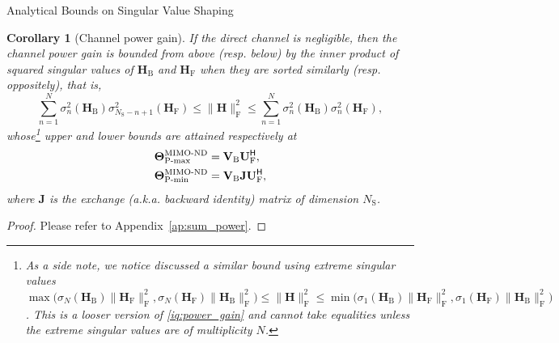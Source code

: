 \documentclass[journal]{IEEEtran}
\newtheorem{corollary}{Corollary}[proposition]
\begin{document}
\begin{section}{Analytical Bounds on Singular Value Shaping}
		\begin{corollary}[Channel power gain\label{co:sum_power}]
			If the direct channel is negligible, then the channel power gain is bounded from above (resp. below) by the inner product of squared singular values of $\mathbf{H}_\mathrm{B}$ and $\mathbf{H}_\mathrm{F}$ when they are sorted similarly (resp. oppositely), that is,
			\begin{equation}
				\sum_{n=1}^N \sigma_n^2(\mathbf{H}_\mathrm{B}) \sigma_{N_\mathrm{S}-n+1}^2(\mathbf{H}_\mathrm{F}) \le \lVert \mathbf{H} \rVert _\mathrm{F}^2 \le \sum_{n=1}^N \sigma_n^2(\mathbf{H}_\mathrm{B}) \sigma_n^2(\mathbf{H}_\mathrm{F}),
				\label{iq:power_gain}
			\end{equation}
			whose\footnote{As a side note, we notice \cite{Fang1994} discussed a similar bound using extreme singular values $\max\bigl(\sigma_{N}(\mathbf{H}_\mathrm{B}) \lVert \mathbf{H}_\mathrm{F} \rVert _\mathrm{F}^2, \sigma_{N}(\mathbf{H}_\mathrm{F}) \lVert \mathbf{H}_\mathrm{B} \rVert _\mathrm{F}^2\bigr) \le \lVert \mathbf{H} \rVert _\mathrm{F}^2 \le \min\bigl(\sigma_1(\mathbf{H}_\mathrm{B}) \lVert \mathbf{H}_\mathrm{F} \rVert _\mathrm{F}^2, \sigma_1(\mathbf{H}_\mathrm{F}) \lVert \mathbf{H}_\mathrm{B} \rVert _\mathrm{F}^2\bigr)$. This is a looser version of \eqref{iq:power_gain} and cannot take equalities unless the extreme singular values are of multiplicity $N$.} upper and lower bounds are attained respectively at
			\begin{subequations}
				\begin{align}
					\mathbf{\Theta}_\textnormal{P-max}^\textnormal{MIMO-ND} & = \mathbf{V}_\mathrm{B} \mathbf{U}_\mathrm{F}^\mathsf{H}, \label{eq:power_max} \\
					\mathbf{\Theta}_\textnormal{P-min}^\textnormal{MIMO-ND} & = \mathbf{V}_\mathrm{B} \mathbf{J} \mathbf{U}_\mathrm{F}^\mathsf{H} \label{eq:power_min},
				\end{align}
			\end{subequations}
			where $\mathbf{J}$ is the exchange (a.k.a. backward identity) matrix of dimension $N_\mathrm{S}$.
		\end{corollary}
		\begin{proof}
			Please refer to Appendix~\ref{ap:sum_power}.
		\end{proof}


\end{section}
\end{document}

